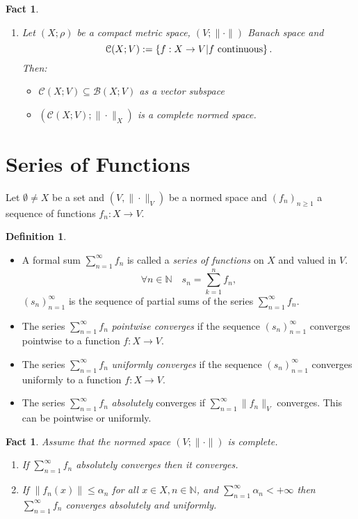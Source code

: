 \documentclass[12pt]{amsbook}
\newtheorem{fact}[theorem]{Fact}
\theoremstyle{definition}
\newtheorem{definition}[theorem]{Definition}
\newcommand{\NN}{{\mathbb N}}
\newcommand{\cB}{{\mathcal B}}
\newcommand{\cC}{{\mathcal C}}
\newcommand{\ra}{\rightarrow} %
\begin{document}
\begin{fact}
\begin{enumerate}
\begin{proof}
hence $f_n \xrightarrow[n]{\|\cdot\|_X} f$.
\end{proof}

\item Let $(X; \rho)$ be a compact metric space, $(V; \|\cdot\|)$ Banach space and
\begin{equation*} \cC(X; V) := \left\{f: X \ra V | f \textup{ continuous} \right\}. \end{equation*}
Then:
\begin{itemize}
\item[$\bullet$] $\cC(X; V) \subseteq \cB(X; V)$ as a vector subspace
\item[$\bullet$] $(\cC(X; V); \|\cdot\|_X)$ is a complete normed space.
\end{itemize}
\end{enumerate}
\end{fact}

\section{Series of Functions}

Let $\emptyset \neq X$ be a set and $(V, \|\cdot\|_V)$ be a normed space and $(f_n)_{n \geq 1}$ a sequence of functions $f_n : X \ra V$.

\begin{definition} \
\begin{itemize}
\item[$\bullet$] A formal sum $\sum_{n=1}^\infty f_n$ is called a \emph{series of functions} on $X$ and valued in $V$.
\begin{equation*} \forall n \in \NN \quad s_n = \sum_{k=1}^n f_n, \end{equation*}
$(s_n)_{n=1}^\infty$ is the sequence of partial sums of the series $\sum_{n=1}^\infty f_n$.
\item[$\bullet$] The series $\sum_{n=1}^\infty f_n$ \emph{pointwise converges} if the sequence $(s_n)_{n=1}^\infty$ converges pointwise to a function $f: X \ra V$.
\item[$\bullet$] The series $\sum_{n=1}^\infty f_n$ \emph{uniformly converges} if the sequence $(s_n)_{n=1}^\infty$ converges uniformly to a function $f: X \ra V$.
\item[$\bullet$] The series $\sum_{n=1}^\infty f_n$ \emph{absolutely} converges if $\sum_{n=1}^\infty \|f_n\|_V$ converges. This can be pointwise or uniformly.
\end{itemize}
\end{definition}

\begin{fact} 
Assume that the normed space $(V; \|\cdot\|)$ is complete.
\begin{enumerate}
\item If $\sum_{n=1}^\infty f_n$ absolutely converges then it converges.
\item If $\|f_n(x)\| \leq \alpha_n$ for all $x \in X, n \in \NN$, and $\sum_{n=1}^\infty \alpha_n < +\infty$ then $\sum_{n=1}^\infty f_n$ converges absolutely and uniformly.
\end{enumerate}
\end{fact}
\end{document}
